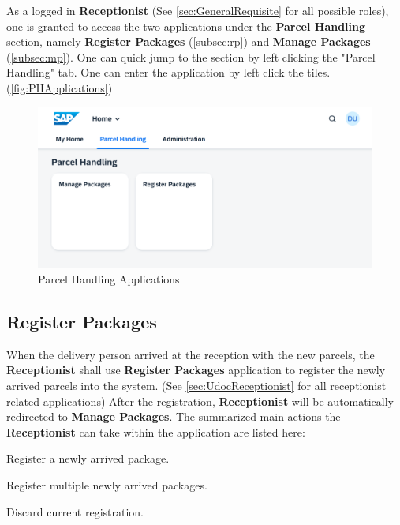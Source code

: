 As a logged in \textbf{Receptionist} (See \autoref{sec:GeneralRequisite} for all possible roles), one is granted to access the two applications under the \textbf{Parcel Handling} section, namely \textbf{Register Packages} (\autoref{subsec:rp}) and \textbf{Manage Packages} (\autoref{subsec:mp}). One can quick jump to the section by left clicking the "Parcel Handling" tab. One can enter the application by left click the tiles. (\autoref{fig:PHApplications})

\begin{figure}[H]
	\centering
	\includegraphics[width=1\linewidth]{images/user_doc/overviews/ParcelHandlingTab.png}
	\caption{Parcel Handling Applications}
	\label{fig:PHApplications}
\end{figure}


\subsection{Register Packages}
\label{subsec:rp}

When the delivery person arrived at the reception with the new parcels, the \textbf{Receptionist} shall use \textbf{Register Packages} application to register the newly arrived parcels into the system. (See \autoref{sec:UdocReceptionist} for all receptionist related applications) After the registration, \textbf{Receptionist} will be automatically redirected to  \textbf{Manage Packages}.
The summarized main actions the \textbf{Receptionist} can take within the application are listed here:

\begin{compactenum}
	\item Register a newly arrived package.
    \item Register multiple newly arrived packages.
    \item Discard current registration.
\end{compactenum}

